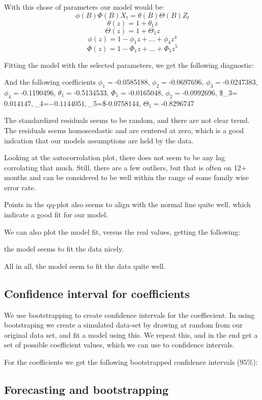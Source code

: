 \documentclass[]{article}
\begin{document}
With this chose of parameters our model would be:
\[\phi(B)\Phi(B)X_t = \theta(B)\Theta(B)Z_ t\] \[\theta(z)=1+\theta_1z\]
\[\Theta(z)=1+\Theta_1z\] \[\phi(z)=1-\phi_1z+\dots+\phi_ 4z^4\]
\[\Phi(z)=1-\Phi_1z+\dots+\Phi_5z^5\]

Fitting the model with the selected parameters, we get the following
diagnostic:

And the following coefficients \(\phi_1=\)-0.0585188,
\(\phi_2=\)-0.0697696, \(\phi_3=\)-0.0247383,\(\phi_4=\)-0.1190496,
\(\theta_1=\)-0.5134533, \(\Phi_1=\)-0.0165048, \(\phi_2=\)-0.0992696,
\$\Phi\_3=\(0.014147,\)\Phi\_4=\(-0.1144051,\)\Phi\_5=\$-0.0758144,
\(\Theta_1=\)-0.8296747

The standardized residuals seems to be random, and there are not clear
trend. The residuals seems homoscedastic and are centered at zero, which
is a good indcation that our models assumptions are held by the data.

Looking at the autocorrolation plot, there does not seem to be any lag
corrolating that much. Still, there are a few outliers, but that is
often on 12+ months and can be considered to be well within the range of
some family wise error rate.

Points in the qq-plot also seems to align with the normal line quite
well, which indicate a good fit for our model.

We can also plot the model fit, versus the real values, getting the
following:

the model seems to fit the data nicely.

All in all, the model seem to fit the data quite well.

\hypertarget{confidence-interval-for-coefficients}{%
\subsection{Confidence interval for
coefficients}\label{confidence-interval-for-coefficients}}

We use bootstrapping to create confidence intervals for the
coeffiecient. In using bootstraping we create a simulated data-set by
drawing at random from our original data set, and fit a model using
this. We repeat this, and in the end get a set of possible coefficient
values, which we can use to confidence intervals.

For the coefficients we get the following bootstrapped confidence
intervals (95\%):

\hypertarget{forecasting-and-bootstrapping}{%
\subsection{Forecasting and
bootstrapping}\label{forecasting-and-bootstrapping}}
\end{document}

